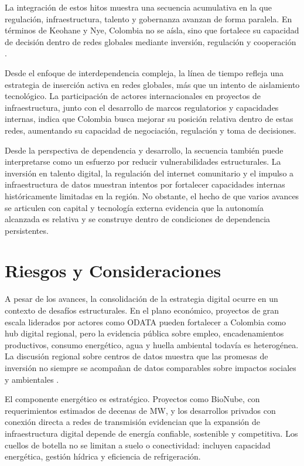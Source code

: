 \documentclass[9pt,letterpaper,twocolumn,twoside,apabib]{rho-class/rho}
\begin{document}
La integración de estos hitos muestra una secuencia acumulativa en la que regulación, infraestructura, talento y gobernanza avanzan de forma paralela. En términos de Keohane y Nye, Colombia no se aísla, sino que fortalece su capacidad de decisión dentro de redes globales mediante inversión, regulación y cooperación \parencite{keohane_nye_power_2011}.

Desde el enfoque de interdependencia compleja, la línea de tiempo refleja una estrategia de inserción activa en redes globales, más que un intento de aislamiento tecnológico. La participación de actores internacionales en proyectos de infraestructura, junto con el desarrollo de marcos regulatorios y capacidades internas, indica que Colombia busca mejorar su posición relativa dentro de estas redes, aumentando su capacidad de negociación, regulación y toma de decisiones.

Desde la perspectiva de dependencia y desarrollo, la secuencia también puede interpretarse como un esfuerzo por reducir vulnerabilidades estructurales. La inversión en talento digital, la regulación del internet comunitario y el impulso a infraestructura de datos muestran intentos por fortalecer capacidades internas históricamente limitadas en la región. No obstante, el hecho de que varios avances se articulen con capital y tecnología externa evidencia que la autonomía alcanzada es relativa y se construye dentro de condiciones de dependencia persistentes.

\section{Riesgos y Consideraciones}

A pesar de los avances, la consolidación de la estrategia digital ocurre en un contexto de desafíos estructurales. En el plano económico, proyectos de gran escala liderados por actores como ODATA pueden fortalecer a Colombia como hub digital regional, pero la evidencia pública sobre empleo, encadenamientos productivos, consumo energético, agua y huella ambiental todavía es heterogénea. La discusión regional sobre centros de datos muestra que las promesas de inversión no siempre se acompañan de datos comparables sobre impactos sociales y ambientales \parencite{aosfatos_data_centers_latam_2025}.

El componente energético es estratégico. Proyectos como BioNube, con requerimientos estimados de decenas de MW, y los desarrollos privados con conexión directa a redes de transmisión evidencian que la expansión de infraestructura digital depende de energía confiable, sostenible y competitiva. Los cuellos de botella no se limitan a suelo o conectividad: incluyen capacidad energética, gestión hídrica y eficiencia de refrigeración.
\end{document}
